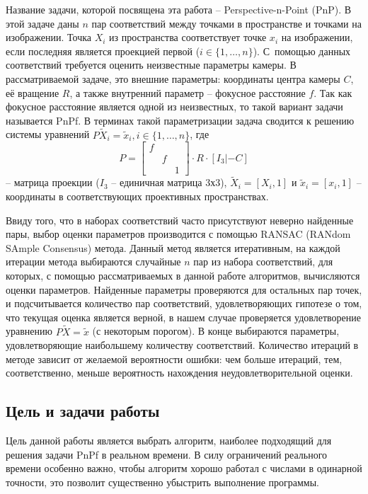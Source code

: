 \documentclass[%
bachelor,    %
natbib,      %
subf,        %
href,        %
colorlinks,  %
]{disser}
\begin{document}
Название задачи, которой посвящена эта работа -- Perspective-n-Point (PnP).
В этой задаче даны $n$ пар соответствий между точками в пространстве и точками на изображении. 
Точка $X_i$ из пространства соответствует точке $x_i$ на изображении, если последняя является проекцией первой ($i\in\{1,\ldots ,n\}$).
С~помощью данных соответствий требуется оценить неизвестные параметры камеры.
В рассматриваемой задаче, это внешние параметры: координаты центра камеры $C$, её вращение $R$, а также внутренний параметр -- фокусное расстояние $f$.
Так как фокусное расстояние является одной из неизвестных, то такой вариант задачи называется PnPf.
В терминах такой параметризации задача сводится к решению системы уравнений $P\widetilde{X}_i = \widetilde{x}_i, i\in\{1,\ldots ,n\}$, где 
\begin{equation*}
    P = \begin{bmatrix}
    f & & \\
    & f & \\
    & & 1
  \end{bmatrix}\cdot R\cdot[I_3|-C]
\end{equation*}
 -- матрица проекции \cite{mvg} ($I_3$ -- единичная матрица 3х3), $\widetilde{X}_i = [X_i, 1]$ и $\widetilde{x}_i = [x_i, 1]$ -- координаты в соответствующих проективных пространствах.

Ввиду того, что в наборах соответствий часто присутствуют неверно найденные пары, выбор оценки параметров производится с помощью RANSAC (RANdom SAmple Consensus) метода. 
Данный метод является итеративным, на каждой итерации метода выбираются случайные $n$ пар из набора соответствий, для которых, с помощью рассматриваемых в данной работе алгоритмов, вычисляются оценки параметров. 
Найденные параметры проверяются для остальных пар точек, и подсчитывается количество пар соответствий, удовлетворяющих гипотезе о том, что текущая оценка является верной, в нашем случае проверяется удовлетворение уравнению $P\widetilde X = \widetilde x$ (с некоторым порогом). В конце выбираются параметры, удовлетворяющие наибольшему количеству соответствий. Количество итераций в методе зависит от желаемой вероятности ошибки: чем больше итераций, тем, соответственно, меньше вероятность нахождения неудовлетворительной оценки.

\subsection{Цель и задачи работы}
Цель данной работы является выбрать алгоритм, наиболее подходящий для решения задачи PnPf в реальном времени.
В силу ограничений реального времени особенно важно, чтобы алгоритм хорошо работал с числами в одинарной точности, это позволит существенно убыстрить выполнение программы.
\end{document}
